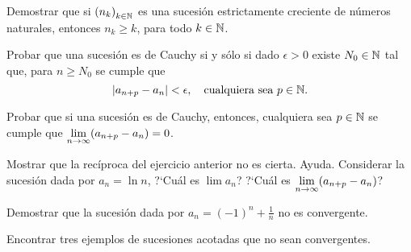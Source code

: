 \item Demostrar que si $\left(n_k\right)_{k\in\mathbb{N}}$ es una sucesión estrictamente creciente de números naturales, entonces $n_k \ge k$, para todo $k\in\mathbb{N}$.
\item * Probar que una sucesión es de Cauchy si y sólo si dado $\epsilon>0$ existe $N_0\in\mathbb{N}$ tal que, para $n\ge N_0$ se cumple que
\[
|a_{n+p} - a_n| < \epsilon,\quad \text{cualquiera sea $p\in\mathbb{N}$}.
\]

\item Probar que si una sucesión es de Cauchy, entonces, cualquiera sea $p\in\mathbb{N}$ se cumple que
$\displaystyle\lim_{n\to\infty} (a_{n+p}-a_n) = 0$.

\item Mostrar que la recíproca del ejercicio anterior no es cierta. Ayuda. Considerar la sucesión dada por $a_n = \ln n$, ?`Cuál es $\lim a_n$? ?`Cuál es $\displaystyle\lim_{n\to\infty} (a_{n+p}-a_n)$? 

\item Demostrar que la sucesión dada por $a_n = (-1)^n+\frac1n$ no es convergente.

\item Encontrar tres ejemplos de sucesiones acotadas que no sean convergentes.

